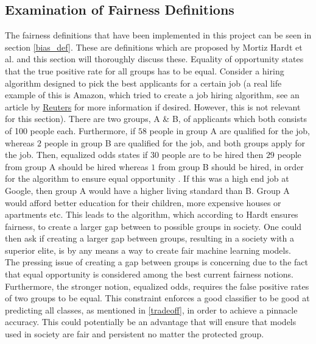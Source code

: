 \documentclass[11pt, fleqn, titlepage]{article}
\begin{document}
	\subsection{Examination of Fairness Definitions}\label{examination_of_fairness_definitions}
	The fairness definitions that have been implemented in this project can be seen in section \ref{bias_def}. These are definitions which are proposed by Mortiz Hardt et al. and this section will thoroughly discuss these. Equality of opportunity states that the true positive rate for all groups has to be equal. Consider a hiring algorithm designed to pick the best applicants for a certain job (a real life example of this is Amazon, which tried to create a job hiring algorithm, see an article by \href{https://www.reuters.com/article/us-amazon-com-jobs-automation-insight/amazon-scraps-secret-ai-recruiting-tool-that-showed-bias-against-women-idUSKCN1MK08G}{Reuters} for more information if desired. However, this is not relevant for this section). There are two groups, A \& B, of applicants which both consists of 100 people each. Furthermore, if $ 58 $ people in group A are qualified for the job, whereas $ 2 $ people in group B are qualified for the job, and both groups apply for the job. Then, equalized odds states if $ 30 $ people are to be hired then $ 29 $ people from group A should be hired whereas $ 1 $ from group B should be hired, in order for the algorithm to ensure equal opportunity \cite{towardsdata}. If this was a high end job at Google, then group A would have a higher living standard than B. Group A would afford better education for their children, more expensive houses or apartments etc. This leads to the algorithm, which according to Hardt ensures fairness, to create a larger gap between to possible groups in society. One could then ask if creating a larger gap between groups, resulting in a society with a superior elite, is by any means a way to create fair machine learning models. \newline
	\\
	\noindent 
	The pressing issue of creating a gap between groups is concerning due to the fact that equal opportunity is considered among the best current fairness notions. Furthermore, the stronger notion, equalized odds, requires the false positive rates of two groups to be equal. This constraint enforces a good classifier to be good at predicting all classes, as mentioned in \ref{tradeoff}, in order to achieve a pinnacle accuracy. This could potentially be an advantage that will ensure that models used in society are fair and persistent no matter the protected group. 
	
\end{document}
